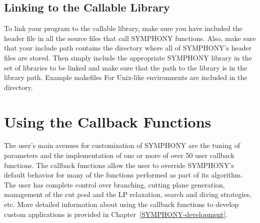 \subsection{Linking to the Callable Library}

To link your program to the callable library, make sure you have included the
header file  in all the source files that call SYMPHONY
functions. Also, make sure that your include path contains the directory where
all of SYMPHONY's header files are stored. Then simply include the appropriate
SYMPHONY library in the set of libraries to be linked and make sure that the
path to the library is in the library path. Example makefiles For Unix-like
environments are included in the  directory. 

\section{Using the Callback Functions}\label{callback}

The user's main avenues for customization of SYMPHONY are the tuning of
parameters and the implementation of one or more of over 50 user callback
functions. The callback functions allow the user to override SYMPHONY's
default behavior for many of the functions performed as part of its algorithm.
The user has complete control over branching, cutting plane generation,
management of the cut pool and the LP relaxation, search and diving
strategies, etc. More detailed information about using the callback functions
to develop custom applications is provided in
Chapter~\ref{SYMPHONY-development}.

